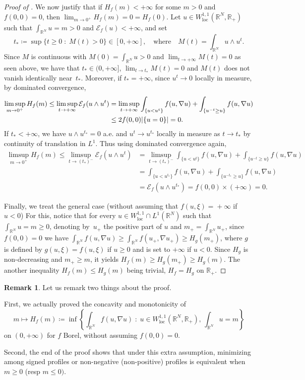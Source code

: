 \documentclass[JEP,XML,SOM,Unicode,published]{cedram}
\theoremstyle{plain}
\theoremstyle{definition}
\newtheorem{remark}[theorem]{Remark}
\newcommand{\R}{\mathbb{R}}
\newcommand{\ener}{\mathcal{E}}
\newcommand{\loc}{\mathrm{loc}}
\newcommand{\st}{\;:\;}
\DeclarePairedDelimiter{\abs}{\lvert}{\rvert}
\begin{document}
\begin{proof}[Proof of ]
We now justify that if \(H_f(m)<+\infty\) for some \(m>0\) and $f(0,0) = 0$, then \(\lim_{m\to 0^+}H_f(m) = 0 = H_f(0)\). Let \(u\in W^{1,1}_\loc(\R^N,\R_+)\) such that \(\int_{\R^N}u=m>0\) and \(\ener_f(u)<+\infty\), and set
\[
t_\ast\coloneqq\sup\{t\geq 0\st M(t)>0\}\in [0,+\infty], \quad\text{where}\quad M(t)=\int_{\R^N}u\wedge u^t.
\]
Since \(M\) is continuous with \(M(0)=\int_{\R^N}u>0\) and \(\lim_{t\to +\infty}M(t)=0\) as seen above, we have that \(t_\ast\in (0,+\infty]\), \(\lim_{t\to t_\ast}M(t)=0\) and $M(t)$ does not vanish identically near~$t_\ast$. Moreover, if \(t_\ast=+\infty\), since \(u^t\to 0\) locally in measure, by dominated convergence,
\begin{align*}
\limsup_{m\to 0^+}H_f(m)\leq \limsup_{t\to +\infty}\ener_f(u\wedge u^t)
&=\limsup_{t\to +\infty}\int_{\{u<u^t\}}f(u,\nabla u)+\int_{\{u^{-t}\geq u\}}f(u,\nabla u)\\
&\leq 2f(0,0) \abs{\{u=0\}} = 0.
\end{align*}
If \(t_\ast<+\infty\), we have \(u\wedge u^{t_\ast}=0\) a.e. and \(u^t\to u^{t_\ast}\) locally in measure as \(t\to t_\ast\) by continuity of translation in \(L^1\). Thus using dominated convergence again,
\begin{align*}
\limsup_{m\to 0^+}H_f(m)\leq\limsup_{t\to (t_\ast)^-}\ener_f(u\wedge u^t)
&=\limsup_{t\to (t_\ast)^-}\int_{\{u<u^t\}}f(u,\nabla u)+\int_{\{u^{-t}\geq u\}}f(u,\nabla u)\\
&=\int_{\{u< u^{t_\ast}\}}f(u,\nabla u)+\int_{\{u^{-t_\ast}\geq u\}}f(u,\nabla u)\\
&= \ener_f(u\wedge u^{t_\ast}) = f(0,0) \times(+\infty) = 0.
\end{align*}

Finally, we treat the general case (without assuming that $f(u,\xi) \!=\! +\infty$ if \hbox{$u\!<\!0$}) For this, notice that for every $u\in W^{1,1}_\loc\cap L^1(\R^N)$ such that $\int_{\R^N}u=m \geq 0$, denoting by~$u_+$ the positive part of $u$ and $m_+ = \int_{\R^N} u_+$, since $f(0,0) = 0$ we have $\int_{\R^N} f(u,\nabla u) \geq \int_{\R^N} f(u_+,\nabla u_+) \geq H_g(m_+)$, where $g$ is defined by $g(u,\xi) = f(u,\xi)$ if $u\geq 0$ and is set to $+\infty$ if $u<0$. Since $H_g$ is non-decreasing and $m_+ \geq m$, it yields $H_f(m) \geq H_g(m_+) \geq H_g(m)$. The another inequality $H_f(m) \leq H_g(m)$ being trivial, $H_f = H_g$ on $\R_+$.
\end{proof}
\begin{remark}\label{without_f_zero_at_zero}
Let us remark two things about the proof.

First, we actually proved the concavity and monotonicity of
\begin{equation*}
m\mapsto H_f(m) \coloneqq \inf\left\{\int_{\R^N}f(u,\nabla u)\st u\in W^{1,1}_\loc(\R^N,\R_+),\,\int_{\R^N}u=m\right\}
\end{equation*}
on $(0,+\infty)$ for $f$ Borel, without assuming $f(0,0) = 0$.

Second, the end of the proof shows that under this extra assumption, minimizing among signed profiles or non-negative (\resp non-positive) profiles is equivalent when $m \geq 0$ (resp $m \leq 0)$.
\end{remark}
\end{document}
